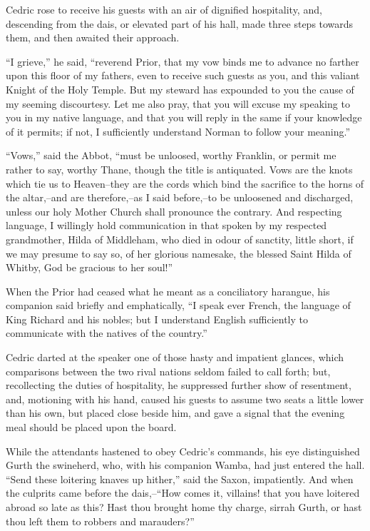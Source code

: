 Cedric rose to receive his guests with an air of dignified hospitality,
and, descending from the dais, or elevated part of his hall, made three
steps towards them, and then awaited their approach.

``I grieve,'' he said, ``reverend Prior, that my vow binds me to advance
no farther upon this floor of my fathers, even to receive such guests as
you, and this valiant Knight of the Holy Temple. But my steward has
expounded to you the cause of my seeming discourtesy. Let me also pray,
that you will excuse my speaking to you in my native language, and that
you will reply in the same if your knowledge of it permits; if not, I
sufficiently understand Norman to follow your meaning.''

``Vows,'' said the Abbot, ``must be unloosed, worthy Franklin, or permit
me rather to say, worthy Thane, though the title is antiquated. Vows are
the knots which tie us to Heaven--they are the cords which bind the
sacrifice to the horns of the altar,--and are therefore,--as I said
before,--to be unloosened and discharged, unless our holy Mother Church
shall pronounce the contrary. And respecting language, I willingly hold
communication in that spoken by my respected grandmother, Hilda of
Middleham, who died in odour of sanctity, little short, if we may
presume to say so, of her glorious namesake, the blessed Saint Hilda of
Whitby, God be gracious to her soul!''

When the Prior had ceased what he meant as a conciliatory harangue, his
companion said briefly and emphatically, ``I speak ever French, the
language of King Richard and his nobles; but I understand English
sufficiently to communicate with the natives of the country.''

Cedric darted at the speaker one of those hasty and impatient glances,
which comparisons between the two rival nations seldom failed to call
forth; but, recollecting the duties of hospitality, he suppressed
further show of resentment, and, motioning with his hand, caused his
guests to assume two seats a little lower than his own, but placed close
beside him, and gave a signal that the evening meal should be placed
upon the board.

While the attendants hastened to obey Cedric's commands, his eye
distinguished Gurth the swineherd, who, with his companion Wamba, had
just entered the hall. ``Send these loitering knaves up hither,'' said
the Saxon, impatiently. And when the culprits came before the
dais,--``How comes it, villains! that you have loitered abroad so late
as this? Hast thou brought home thy charge, sirrah Gurth, or hast thou
left them to robbers and marauders?''

